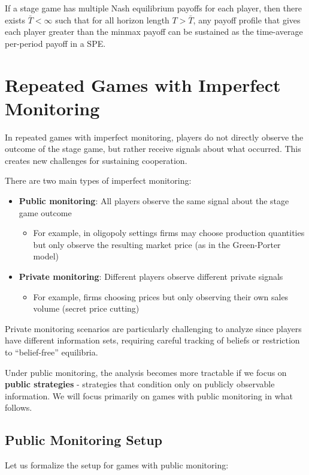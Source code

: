 \documentclass[11pt]{elegantbook_2}
\begin{document}
\begin{theorem}
    If a stage game has multiple Nash equilibrium payoffs for each player, then there exists $\bar{T}<\infty$ such that for all horizon length $T>\bar{T}$, any payoff profile that gives each player greater than the minmax payoff can be sustained as the time-average per-period payoff in a SPE.
\end{theorem}

\section{Repeated Games with Imperfect Monitoring}
In repeated games with imperfect monitoring, players do not directly observe the outcome of the stage game, but rather receive signals about what occurred. This creates new challenges for sustaining cooperation.

There are two main types of imperfect monitoring:

\begin{itemize}
    \item \textbf{Public monitoring}: All players observe the same signal about the stage game outcome
        \begin{itemize}
            \item For example, in oligopoly settings firms may choose production quantities but only observe the resulting market price (as in the Green-Porter model)
        \end{itemize}
    \item \textbf{Private monitoring}: Different players observe different private signals
        \begin{itemize}
            \item For example, firms choosing prices but only observing their own sales volume (secret price cutting)
        \end{itemize}
\end{itemize}

Private monitoring scenarios are particularly challenging to analyze since players have different information sets, requiring careful tracking of beliefs or restriction to ``belief-free'' equilibria.

Under public monitoring, the analysis becomes more tractable if we focus on \textbf{public strategies} - strategies that condition only on publicly observable information. We will focus primarily on games with public monitoring in what follows.

\subsection{Public Monitoring Setup}
Let us formalize the setup for games with public monitoring:
\end{document}
